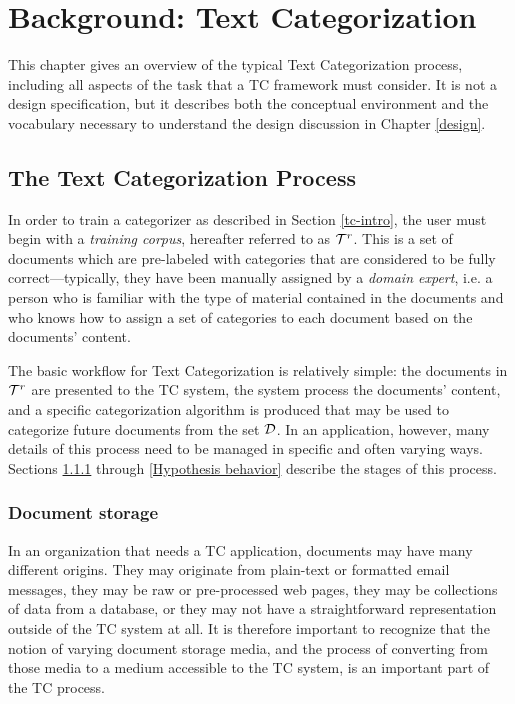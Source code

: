 \chapter{Background: Text Categorization}
\label{background-tc}

This chapter gives an overview of the typical Text Categorization
process, including all aspects of the task that a TC framework must
consider.  It is not a design specification, but it describes both the
conceptual environment and the vocabulary necessary to understand the
design discussion in Chapter \ref{design}.

\section{The Text Categorization Process}

In order to train a categorizer as described in Section
\ref{tc-intro}, the user must begin with a \emph{training corpus},
hereafter referred to as $\mathcal{T}^r$.  This is a set of documents which
are pre-labeled with categories that are considered to be fully
correct---typically, they have been manually assigned by a
\emph{domain expert}, i.e. a person who is familiar with the type of
material contained in the documents and who knows how to assign a set
of categories to each document based on the documents' content.

The basic workflow for Text Categorization is relatively simple: the
documents in $\mathcal{T}^r$ are presented to the TC system, the system
process the documents' content, and a specific categorization
algorithm is produced that may be used to categorize future documents
from the set $\mathcal{D}$.  In an application, however, many details of
this process need to be managed in specific and often varying ways.
Sections \ref{Document storage} through \ref{Hypothesis behavior}
describe the stages of this process.

\subsection{Document storage}
\label{Document storage}

In an organization that needs a TC application, documents may have
many different origins.  They may originate from plain-text or
formatted email messages, they may be raw or pre-processed web pages,
they may be collections of data from a database, or they may not have
a straightforward representation outside of the TC system at all.  It
is therefore important to recognize that the notion of varying
document storage media, and the process of converting from those media
to a medium accessible to the TC system, is an important part of the
TC process.

